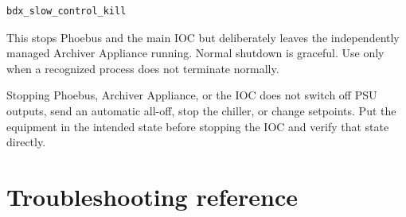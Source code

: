 \begin{lstlisting}[style=shell]
bdx_slow_control_kill
\end{lstlisting}

This stops Phoebus and the main IOC but deliberately leaves the independently managed Archiver Appliance running. Normal shutdown is graceful. Use  only when a recognized process does not terminate normally.

\begin{warningbox}
Stopping Phoebus, Archiver Appliance, or the IOC does not switch off PSU outputs, send an automatic all-off, stop the chiller, or change setpoints. Put the equipment in the intended state before stopping the IOC and verify that state directly.
\end{warningbox}

\section{Troubleshooting reference}

